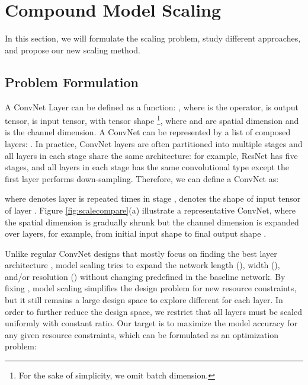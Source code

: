 \documentclass{article}
\begin{document}
\section{Compound Model Scaling}
\label{sec:study}
 
In this section, we will formulate the scaling problem,  study different approaches, and propose our new scaling method.

\subsection{Problem Formulation}
 
A ConvNet Layer  can be defined as a function: , where  is the operator,  is output tensor,  is input tensor, with tensor shape  \footnote{For the sake of simplicity, we omit batch dimension.}, where  and  are spatial dimension and  is the channel dimension. A ConvNet  can be represented by a list of composed layers:  .  In practice, ConvNet layers are often partitioned into multiple stages and all layers in each stage share the same architecture: for example,  ResNet \cite{resnet16} has five stages, and all layers in each stage has the same convolutional type except the first layer performs down-sampling. Therefore, we can define a ConvNet as:

\vspace{-0.1in}

\vspace{-0.1in}

where  denotes layer  is repeated  times in stage ,   denotes the shape of input tensor  of layer .   Figure \ref{fig:scalecompare}(a) illustrate a representative ConvNet, where the spatial dimension is gradually shrunk but the channel dimension is  expanded over layers, for example, from  initial input shape  to  final output shape .

Unlike regular ConvNet designs that mostly focus on finding the best layer architecture , model scaling tries to expand the network length (), width (), and/or resolution () without changing  predefined in the baseline network.  By fixing , model scaling simplifies the design problem for new resource constraints, but it still remains a large design space to explore different  for each layer.  In order to further reduce the design space, we restrict that all layers must be scaled uniformly with constant ratio. Our target is to maximize the model accuracy for any given resource constraints, which can be formulated as an optimization problem:
\end{document}

